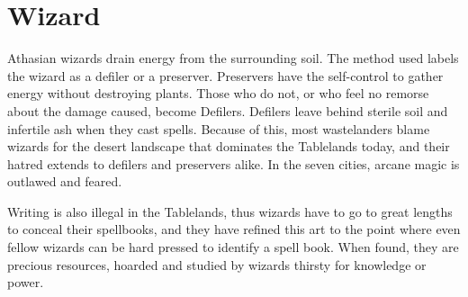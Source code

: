 \section{Wizard}

Athasian wizards drain energy from the surrounding soil. The method used labels the wizard as a defiler or a preserver. Preservers have the self-control to gather energy without destroying plants. Those who do not, or who feel no remorse about the damage caused, become Defilers. Defilers leave behind sterile soil and infertile ash when they cast spells. Because of this, most wastelanders blame wizards for the desert landscape that dominates the Tablelands today, and their hatred extends to defilers and preservers alike. In the seven cities, arcane magic is outlawed and feared.

Writing is also illegal in the Tablelands, thus wizards have to go to great lengths to conceal their spellbooks, and they have refined this art to the point where even fellow wizards can be hard pressed to identify a spell book. When found, they are precious resources, hoarded and studied by wizards thirsty for knowledge or power.

